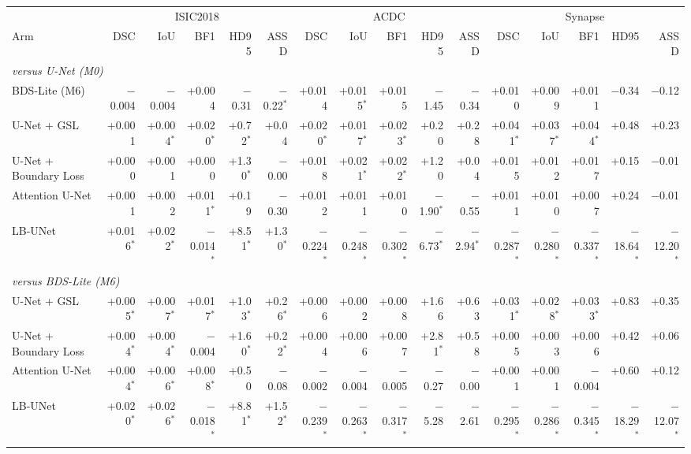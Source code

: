 \begin{tabular}{lrrrrrrrrrrrrrrr}
\toprule
 & \multicolumn{5}{c}{ISIC2018} & \multicolumn{5}{c}{ACDC} & \multicolumn{5}{c}{Synapse} \\
Arm & DSC & IoU & BF1 & HD95 & ASSD & DSC & IoU & BF1 & HD95 & ASSD & DSC & IoU & BF1 & HD95 & ASSD \\
\midrule
\multicolumn{16}{l}{\emph{versus U-Net (M0)}} \\
BDS-Lite (M6) & $-$0.004 & $-$0.004 & +0.004 & $-$0.31 & $-$0.22$^{*}$ & +0.014 & +0.015$^{*}$ & +0.015 & $-$1.45 & $-$0.34 & +0.010 & +0.009 & +0.011 & $-$0.34 & $-$0.12 \\
U-Net + GSL & +0.001 & +0.004$^{*}$ & +0.020$^{*}$ & +0.72$^{*}$ & +0.04 & +0.020$^{*}$ & +0.017$^{*}$ & +0.023$^{*}$ & +0.20 & +0.28 & +0.041$^{*}$ & +0.037$^{*}$ & +0.044$^{*}$ & +0.48 & +0.23 \\
U-Net + Boundary Loss & +0.000 & +0.001 & +0.000 & +1.30$^{*}$ & $-$0.00 & +0.018 & +0.021$^{*}$ & +0.022$^{*}$ & +1.20 & +0.04 & +0.015 & +0.012 & +0.017 & +0.15 & $-$0.01 \\
Attention U-Net & +0.001 & +0.002 & +0.011$^{*}$ & +0.19 & $-$0.30 & +0.012 & +0.011 & +0.010 & $-$1.90$^{*}$ & $-$0.55 & +0.011 & +0.010 & +0.007 & +0.24 & $-$0.01 \\
LB-UNet & +0.016$^{*}$ & +0.022$^{*}$ & $-$0.014$^{*}$ & +8.51$^{*}$ & +1.30$^{*}$ & $-$0.224$^{*}$ & $-$0.248$^{*}$ & $-$0.302$^{*}$ & $-$6.73$^{*}$ & $-$2.94$^{*}$ & $-$0.287$^{*}$ & $-$0.280$^{*}$ & $-$0.337$^{*}$ & $-$18.64$^{*}$ & $-$12.20$^{*}$ \\
\midrule
\multicolumn{16}{l}{\emph{versus BDS-Lite (M6)}} \\
U-Net + GSL & +0.005$^{*}$ & +0.007$^{*}$ & +0.017$^{*}$ & +1.03$^{*}$ & +0.26$^{*}$ & +0.006 & +0.002 & +0.008 & +1.66 & +0.63 & +0.031$^{*}$ & +0.028$^{*}$ & +0.033$^{*}$ & +0.83 & +0.35 \\
U-Net + Boundary Loss & +0.004$^{*}$ & +0.004$^{*}$ & $-$0.004 & +1.60$^{*}$ & +0.22$^{*}$ & +0.004 & +0.006 & +0.007 & +2.81$^{*}$ & +0.58 & +0.005 & +0.003 & +0.006 & +0.42 & +0.06 \\
Attention U-Net & +0.004$^{*}$ & +0.006$^{*}$ & +0.008$^{*}$ & +0.50 & $-$0.08 & $-$0.002 & $-$0.004 & $-$0.005 & $-$0.27 & $-$0.00 & +0.001 & +0.001 & $-$0.004 & +0.60 & +0.12 \\
LB-UNet & +0.020$^{*}$ & +0.026$^{*}$ & $-$0.018$^{*}$ & +8.81$^{*}$ & +1.52$^{*}$ & $-$0.239$^{*}$ & $-$0.263$^{*}$ & $-$0.317$^{*}$ & $-$5.28 & $-$2.61 & $-$0.295$^{*}$ & $-$0.286$^{*}$ & $-$0.345$^{*}$ & $-$18.29$^{*}$ & $-$12.07$^{*}$ \\
\bottomrule
\end{tabular}
